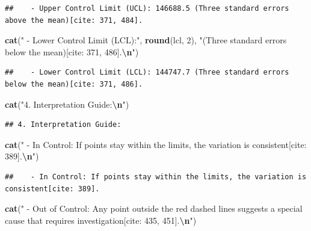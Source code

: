 \documentclass[
]{article}
\newenvironment{Shaded}{\begin{snugshade}}{\end{snugshade}}
\newcommand{\DecValTok}[1]{\textcolor[rgb]{0.00,0.00,0.81}{#1}}
\newcommand{\FunctionTok}[1]{\textcolor[rgb]{0.13,0.29,0.53}{\textbf{#1}}}
\newcommand{\NormalTok}[1]{#1}
\newcommand{\SpecialCharTok}[1]{\textcolor[rgb]{0.81,0.36,0.00}{\textbf{#1}}}
\newcommand{\StringTok}[1]{\textcolor[rgb]{0.31,0.60,0.02}{#1}}
\begin{document}
\begin{verbatim}
##    - Upper Control Limit (UCL): 146688.5 (Three standard errors above the mean)[cite: 371, 484].
\end{verbatim}

\begin{Shaded}
\begin{Highlighting}[]
\FunctionTok{cat}\NormalTok{(}\StringTok{"   {-} Lower Control Limit (LCL):"}\NormalTok{, }\FunctionTok{round}\NormalTok{(lcl, }\DecValTok{2}\NormalTok{), }\StringTok{"(Three standard errors below the mean)[cite: 371, 486].}\SpecialCharTok{\textbackslash{}n}\StringTok{"}\NormalTok{)}
\end{Highlighting}
\end{Shaded}

\begin{verbatim}
##    - Lower Control Limit (LCL): 144747.7 (Three standard errors below the mean)[cite: 371, 486].
\end{verbatim}

\begin{Shaded}
\begin{Highlighting}[]
\FunctionTok{cat}\NormalTok{(}\StringTok{"4. Interpretation Guide:}\SpecialCharTok{\textbackslash{}n}\StringTok{"}\NormalTok{)}
\end{Highlighting}
\end{Shaded}

\begin{verbatim}
## 4. Interpretation Guide:
\end{verbatim}

\begin{Shaded}
\begin{Highlighting}[]
\FunctionTok{cat}\NormalTok{(}\StringTok{"   {-} In Control: If points stay within the limits, the variation is consistent[cite: 389].}\SpecialCharTok{\textbackslash{}n}\StringTok{"}\NormalTok{)}
\end{Highlighting}
\end{Shaded}

\begin{verbatim}
##    - In Control: If points stay within the limits, the variation is consistent[cite: 389].
\end{verbatim}

\begin{Shaded}
\begin{Highlighting}[]
\FunctionTok{cat}\NormalTok{(}\StringTok{"   {-} Out of Control: Any point outside the red dashed lines suggests a \textquotesingle{}special cause\textquotesingle{} that requires investigation[cite: 435, 451].}\SpecialCharTok{\textbackslash{}n}\StringTok{"}\NormalTok{)}
\end{Highlighting}
\end{Shaded}
\end{document}

